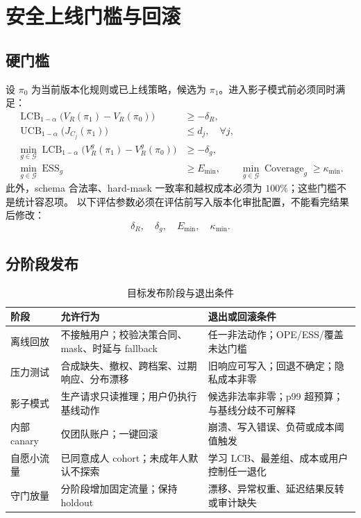 \documentclass[11pt,a4paper,fontset=none]{ctexart}
\DeclareMathOperator{\ESS}{ESS}
\newcommand{\1}{\mathbb{I}}
\begin{document}
\section{安全上线门槛与回滚}

\subsection{硬门槛}

设 $\pi_0$ 为当前版本化规则或已上线策略，候选为 $\pi_1$。进入影子模式前必须同时满足：
\begin{align}
  \operatorname{LCB}_{1-\alpha}
  \bigl(V_R(\pi_1)-V_R(\pi_0)\bigr)&\ge-\delta_R,
  \label{eq:reward-gate}\\
  \operatorname{UCB}_{1-\alpha}\bigl(J_{C_j}(\pi_1)\bigr)&\le d_j,
  \quad \forall j,
  \label{eq:cost-gate}\\
  \min_{g\in\mathcal{G}}
  \operatorname{LCB}_{1-\alpha}
  \bigl(V_R^g(\pi_1)-V_R^g(\pi_0)\bigr)&\ge-\delta_g,
  \label{eq:group-gate}\\
  \min_{g\in\mathcal{G}}\ESS_g&\ge E_{\min},
  \qquad
  \min_{g\in\mathcal{G}}\operatorname{Coverage}_g\ge\kappa_{\min}.
  \label{eq:support-gate}
\end{align}
此外，schema 合法率、hard-mask 一致率和越权成本必须为 $100\%$；这些门槛不是统计容忍项。
以下评估参数必须在评估前写入版本化审批配置，不能看完结果后修改：
\begin{equation}
  \delta_R,\quad\delta_g,\quad E_{\min},\quad\kappa_{\min}.
\end{equation}

\FloatBarrier
\clearpage
\subsection{分阶段发布}

\begin{table}[htbp]
  \centering
  \caption{目标发布阶段与退出条件}
  \label{tab:release-gates}
  \begin{tabularx}{\textwidth}{L{25mm}YL{52mm}}
    \toprule
    阶段 & 允许行为 & 退出或回滚条件 \\
    \midrule
    离线回放 & 不接触用户；校验决策合同、mask、时延与 fallback & 任一非法动作；OPE/ESS/覆盖未达门槛 \\
    压力测试 & 合成缺失、撤权、跨档案、过期响应、分布漂移 & 旧响应可写入；回退不确定；隐私成本非零 \\
    影子模式 & 生产请求只读推理；用户仍执行基线动作 & 候选非法率非零；p99 超预算；与基线分歧不可解释 \\
    内部 canary & 仅团队账户；一键回滚 & 崩溃、写入错误、负荷或成本阈值触发 \\
    自愿小流量 & 已同意成人 cohort；未成年人默认不探索 & 学习 LCB、最差组、成本或用户控制任一退化 \\
    守门放量 & 分阶段增加固定流量；保持 holdout & 漂移、异常权重、延迟结果反转或审计缺失 \\
    \bottomrule
  \end{tabularx}
\end{table}
\FloatBarrier
\end{document}
